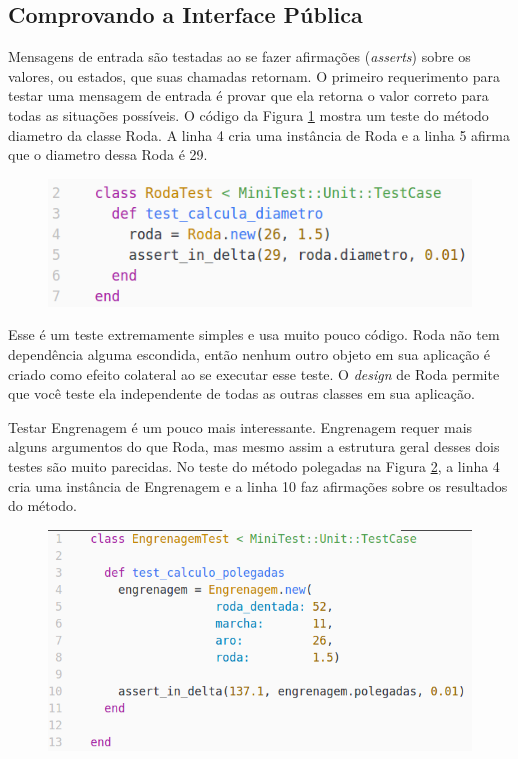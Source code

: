 \subsection{Comprovando a Interface Pública}

Mensagens de entrada são testadas ao se fazer afirmações (\textit{asserts})
sobre os valores, ou estados, que suas chamadas retornam. O primeiro
requerimento para testar uma mensagem de entrada é provar que ela retorna
o valor correto para todas as situações possíveis. O código da Figura \ref{img:codigo_pag_203}
mostra um teste do método diametro da classe Roda. A linha 4 cria uma
instância de Roda e a linha 5 afirma que o diametro dessa Roda é 29.

\begin{figure}[!htbp]
  \center
  \includegraphics[scale=0.50]{imagens/codigo_pag_203.png}
  \label{img:codigo_pag_203}
\end{figure}

Esse é um teste extremamente simples e usa muito pouco código. Roda não tem
dependência alguma escondida, então nenhum outro objeto em sua aplicação é
criado como efeito colateral ao se executar esse teste. O \textit{design}
de Roda permite que você teste ela independente de todas as outras classes
em sua aplicação.

Testar Engrenagem é um pouco mais interessante. Engrenagem requer mais
alguns argumentos do que Roda, mas mesmo assim a estrutura geral desses dois
testes são muito parecidas. No teste do método polegadas na Figura \ref{img:codigo_pag_204},
a linha 4 cria uma instância de Engrenagem e a linha 10 faz afirmações sobre
os resultados do método.

\begin{figure}[!htbp]
  \center
  \includegraphics[scale=0.50]{imagens/codigo_pag_204.png}
  \label{img:codigo_pag_204}
\end{figure}

